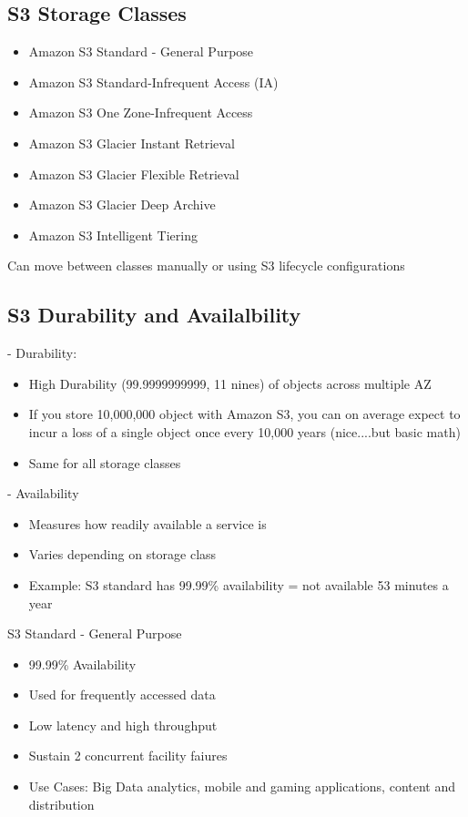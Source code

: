 \subsection{S3 Storage Classes}
\begin{itemize}
    \begin{itemize}
        \item Amazon S3 Standard - General Purpose
        \item Amazon S3 Standard-Infrequent Access (IA)
        \item Amazon S3 One Zone-Infrequent Access
        \item Amazon S3 Glacier Instant Retrieval
        \item Amazon S3 Glacier Flexible Retrieval
        \item Amazon S3 Glacier Deep Archive
        \item Amazon S3 Intelligent Tiering
    \end{itemize}

    Can move between classes manually or using S3 lifecycle configurations

    \subsection{S3 Durability and Availalbility}
    - Durability:
    \begin{itemize}
        \item High Durability (99.9999999999, 11 nines) of objects across multiple AZ
        \item If you store 10,000,000 object with Amazon S3, you can on average expect to incur a loss of a single object once every 10,000 years (nice....but basic math)
        \item Same for all storage classes
    \end{itemize}

    - Availability
    \begin{itemize}
        \item Measures how readily available a service is
        \item Varies depending on storage class
        \item Example: S3 standard has 99.99\% availability = not available 53 minutes a year
    \end{itemize}

    S3 Standard - General Purpose
    \begin{itemize}
        \item 99.99\% Availability
        \item Used for frequently accessed data
        \item Low latency and high throughput
        \item Sustain 2 concurrent facility faiures
        \item Use Cases: Big Data analytics, mobile and gaming applications, content and distribution
    \end{itemize}


\end{itemize}
